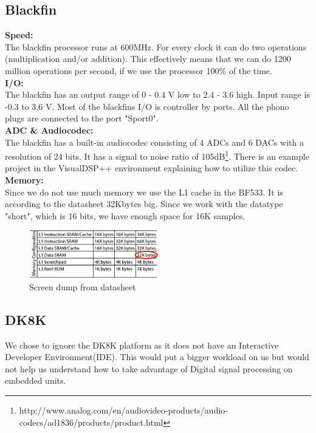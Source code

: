 \subsection{Blackfin}
\textbf{Speed:}\\
The blackfin processor runs at 600MHz. For every clock it can do two operations (multiplication and/or addition). This effectively means that we can do 1200 million operations per second, if we use the processor 100\% of the time.\\
\textbf{I/O:}\\
The blackfin has an output range of 0 - 0.4 V low to 2.4 - 3.6 high. Input range is -0.3 to 3.6 V. Most of the blackfins I/O is controller by ports. All the phono plugs are connected to the port "Sport0". \\
\textbf{ADC \& Audiocodec:}\\
The blackfin has a built-in audiocodec consisting of 4 ADCs and 6 DACs with a resolution of 24 bits. It has a signal to noise ratio of 105dB\footnote{http://www.analog.com/en/audiovideo-products/audio-codecs/ad1836/products/product.html}. There is an example project in the VisualDSP++ environment explaining how to utilize this codec.\\
\textbf{Memory:}\\
Since we do not use much memory we use the L1 cache in the BF533. It is according to the datasheet 32Kbytes big. Since we work with the datatype "short", which is 16 bits, we have enough space for 16K samples.\\
\begin{figure}[hbpt]
\centering
\includegraphics[width=0.5\textwidth]{billeder/memorytable}
\caption[Screen dump from datasheet]{Screen dump from datasheet\footnotemark}
\label{img:mem_table}
\end{figure}
\subsection{DK8K}
We chose to ignore the DK8K platform as it does not have an Interactive Developer Environment(IDE). This would put a bigger workload on us but would not help us understand how to take advantage of Digital signal processing on embedded units.

